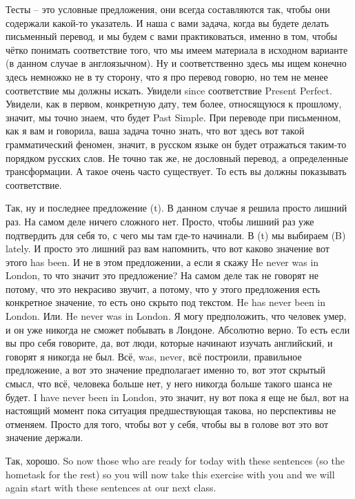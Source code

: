 \documentclass[main.tex]{subfiles}
\begin{document}
Тесты -- это условные предложения, они всегда составляются так, чтобы они содержали какой-то указатель.
И наша с вами задача, когда вы будете делать письменный перевод, и мы будем с вами практиковаться, именно в том, чтобы чётко понимать соответствие того, что мы имеем материала в исходном варианте (в данном случае в англоязычном).
Ну и соответственно здесь мы ищем конечно здесь немножко не в ту сторону, что я про перевод говорю,  но тем не менее соответствие мы должны искать.
Увидели since соответствие Present Perfect.
Увидели, как в первом, конкретную дату, тем более, относящуюся к прошлому, значит, мы точно знаем, что будет Past Simple.
При переводе при письменном, как я вам и говорила, ваша задача точно знать, что вот здесь вот такой грамматический феномен, значит, в русском языке он будет отражаться таким-то порядком русских слов.
Не точно так же, не дословный перевод, а определенные трансформации.
А такое очень часто существует.
То есть вы должны показывать соответствие.

Так, ну и последнее предложение (t).
В данном случае я решила просто лишний раз.
На самом деле ничего сложного нет.
Просто, чтобы лишний раз уже подтвердить для себя то, с чего мы там где-то начинали.
В (t) мы выбираем (B) lately.
И просто это лишний раз вам напомнить, что вот каково значение вот этого has been.
И не в этом предложении, а если я скажу He never was in London, то что значит это предложение?
На самом деле так не говорят не потому, что это некрасиво звучит, а потому, что у этого предложения есть конкретное значение, то есть оно скрыто под текстом.
He has never been in London.
Или.
He never was in London.
Я могу предположить, что человек умер, и он уже никогда не сможет побывать в Лондоне.
Абсолютно верно.
То есть если вы про себя говорите, да, вот люди, которые начинают изучать английский, и говорят я никогда не был.
Всё, was, never, всё построили, правильное предложение, а вот это значение предполагает именно то, вот этот скрытый смысл, что всё, человека больше нет, у него никогда больше такого шанса не будет.
I have never been in London, это значит, ну вот пока я еще не был, вот на настоящий момент пока ситуация предшествующая такова, но перспективы не отменяем.
Просто для того, чтобы вот у себя, чтобы вы в голове вот это вот значение держали.

Так, хорошо.
So now those who are ready for today with these sentences (so the hometask for the rest) so you will now take this exercise with you and we will again start with these sentences at our next class.
\end{document}

